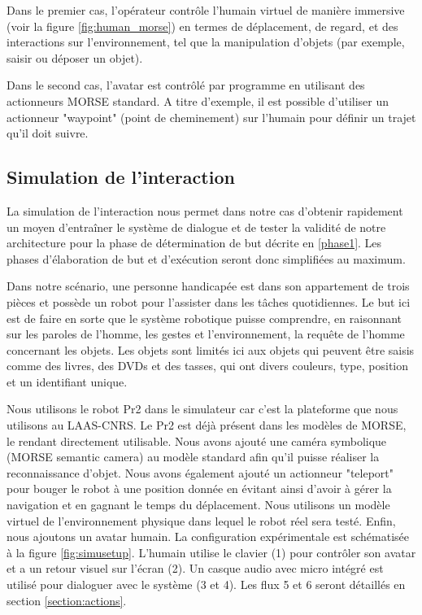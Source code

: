 \documentclass[a4paper,11pt,twoside]{StyleThese}
\begin{document}
Dans le premier cas, l'opérateur contrôle l'humain virtuel de manière immersive (voir la figure \ref{fig:human_morse}) en termes de déplacement, de regard, et des interactions sur l'environnement, tel que la manipulation d'objets (par exemple, saisir ou déposer un objet).

Dans le second cas, l'avatar est contrôlé par programme en utilisant des actionneurs MORSE standard. A titre d'exemple, il est possible d'utiliser un actionneur "waypoint" (point de cheminement) sur l'humain pour définir un trajet qu'il doit suivre.


\subsection{Simulation de l'interaction}

La simulation de l'interaction nous permet dans notre cas d'obtenir rapidement un moyen d'entraîner le système de dialogue et de tester la validité de notre architecture pour la phase de détermination de but décrite en \ref{phase1}.
Les phases d'élaboration de but et d'exécution seront donc simplifiées au maximum.

Dans notre scénario, une personne handicapée est dans son appartement de trois pièces et possède un robot pour l'assister dans les tâches quotidiennes.
Le but ici est de faire en sorte que le système robotique puisse comprendre, en raisonnant sur les paroles de l'homme, les gestes et l'environnement, la requête de l'homme concernant les objets. Les objets sont limités ici aux objets qui peuvent être saisis comme des livres, des DVDs et des tasses, qui ont divers couleurs, type, position et un identifiant unique.

Nous utilisons le robot Pr2 dans le simulateur car c'est la plateforme que nous utilisons au LAAS-CNRS. Le Pr2 est déjà présent dans les modèles de MORSE, le rendant directement utilisable. Nous avons ajouté une caméra symbolique (MORSE semantic camera) au modèle standard afin qu'il puisse réaliser la reconnaissance d'objet. Nous avons également ajouté un actionneur "teleport" pour bouger le robot à une position donnée en évitant ainsi d'avoir à gérer la navigation et en gagnant le temps du déplacement. Nous utilisons un modèle virtuel de l'environnement physique dans lequel le robot réel sera testé. Enfin, nous ajoutons un avatar humain. La configuration expérimentale est schématisée à la figure \ref{fig:simusetup}. L'humain utilise le clavier (1) pour contrôler son avatar et a un retour visuel sur l'écran (2). Un casque audio avec micro intégré est utilisé pour dialoguer avec le système (3 et 4). Les flux 5 et 6 seront détaillés en section \ref{section:actions}. 
\end{document}

